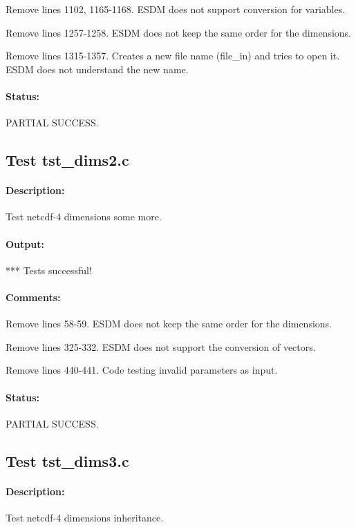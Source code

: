 Remove lines 1102, 1165-1168. ESDM does not support conversion for variables.

Remove lines 1257-1258. ESDM does not keep the same order for the dimensions.

Remove lines 1315-1357. Creates a new file name (file\_in) and tries to open it. ESDM does not understand the new name.

\paragraph{Status:} PARTIAL SUCCESS.

\subsection{Test tst\_dims2.c}

\paragraph{Description:} Test netcdf-4 dimensions some more.

\paragraph{Output:} *** Tests successful!

\paragraph{Comments:} Remove lines 58-59. ESDM does not keep the same order for the dimensions.

Remove lines 325-332. ESDM does not support the conversion of vectors.

Remove lines 440-441. Code testing invalid parameters as input.

\paragraph{Status:} PARTIAL SUCCESS.

\subsection{Test tst\_dims3.c}

\paragraph{Description:} Test netcdf-4 dimensions inheritance.


